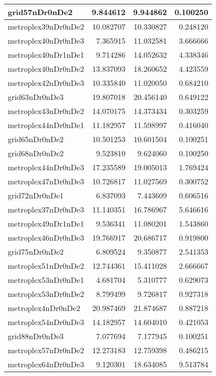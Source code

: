 \documentclass[../../../thesis.tex]{subfiles}
\begin{document}
\begin{longtable}{|l|r|r|r|}
grid57nDr0nDe2 & 9.844612 & 9.944862 & 0.100250 \\\hline
metroplex39nDr0nDe2 & 10.082707 & 10.330827 & 0.248120 \\\hline
metroplex40nDr0nDe3 & 7.365915 & 11.032581 & 3.666666 \\\hline
metroplex40nDr1nDe1 & 9.714286 & 14.052632 & 4.338346 \\\hline
metroplex40nDr0nDe2 & 13.837093 & 18.260652 & 4.423559 \\\hline
metroplex42nDr0nDe3 & 10.335840 & 11.020050 & 0.684210 \\\hline
grid63nDr0nDe3 & 19.807018 & 20.456140 & 0.649122 \\\hline
metroplex43nDr0nDe2 & 14.070175 & 14.373434 & 0.303259 \\\hline
metroplex44nDr0nDe1 & 11.182957 & 11.598997 & 0.416040 \\\hline
grid65nDr0nDe2 & 10.501253 & 10.601504 & 0.100251 \\\hline
grid68nDr0nDe2 & 9.523810 & 9.624060 & 0.100250 \\\hline
metroplex44nDr0nDe3 & 17.235589 & 19.005013 & 1.769424 \\\hline
metroplex47nDr0nDe3 & 10.726817 & 11.027569 & 0.300752 \\\hline
grid72nDr0nDe1 & 6.837093 & 7.443609 & 0.606516 \\\hline
metroplex37nDr0nDe3 & 11.140351 & 16.786967 & 5.646616 \\\hline
metroplex49nDr1nDe1 & 9.536341 & 11.080201 & 1.543860 \\\hline
metroplex46nDr0nDe3 & 19.766917 & 20.686717 & 0.919800 \\\hline
grid75nDr0nDe2 & 6.809524 & 9.350877 & 2.541353 \\\hline
metroplex51nDr0nDe2 & 12.744361 & 15.411028 & 2.666667 \\\hline
metroplex53nDr0nDe1 & 4.681704 & 5.310777 & 0.629073 \\\hline
metroplex53nDr0nDe2 & 8.799499 & 9.726817 & 0.927318 \\\hline
metroplex4nDr0nDe2 & 20.987469 & 21.874687 & 0.887218 \\\hline
metroplex54nDr0nDe3 & 14.182957 & 14.604010 & 0.421053 \\\hline
grid88nDr0nDe3 & 7.077694 & 7.177945 & 0.100251 \\\hline
metroplex57nDr0nDe2 & 12.273183 & 12.759398 & 0.486215 \\\hline
metroplex64nDr0nDe3 & 9.120301 & 18.634085 & 9.513784 \\\hline

\end{longtable}
\end{document}
